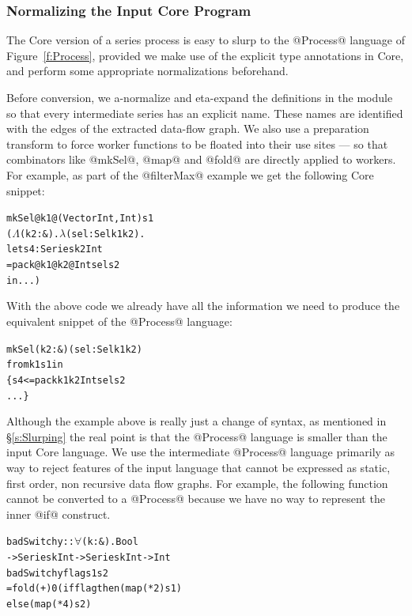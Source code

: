\subsubsection{Normalizing the Input Core Program }
\label{s:Normalizing}
The Core version of a series process is easy to slurp to the @Process@ language of Figure~\ref{f:Process}, provided we make use of the explicit type annotations in Core, and perform some appropriate normalizations beforehand.

Before conversion, we a-normalize and eta-expand the definitions in the module so that every intermediate series has an explicit name. These names are identified with the edges of the extracted data-flow graph. We also use a preparation transform to force worker functions to be floated into their use sites --- so that combinators like @mkSel@, @map@ and @fold@ are directly applied to workers. For example, as part of the @filterMax@ example we get the following Core snippet:
%
\begin{alltt}
  mkSel @k1 @(Vector Int, Int) s1
    (\(\Lambda\)(k2 : &). \(\lambda\)(sel : Sel k1 k2). 
     let s4 : Series k2 Int
            = pack @k1 @k2 @Int sel s2
     in ...)
\end{alltt}

With the above code we already have all the information we need to produce the equivalent snippet of the @Process@ language:
%
\begin{alltt}
  mkSel (k2 : &) (sel : Sel k1 k2) 
       from k1 s1 in 
    \{ s4  <= pack k1 k2 Int sel s2
      ... \}
\end{alltt}

Although the example above is really just a change of syntax, as mentioned in \S\ref{s:Slurping} the real point is that the @Process@ language is smaller than the input Core language. We use the intermediate @Process@ language primarily as way to reject features of the input language that cannot be expressed as static, first order, non recursive data flow graphs. For example, the following function cannot be converted to a @Process@ because we have no way to represent the inner @if@ construct. 

\begin{alltt}
 badSwitchy :: \(\forall\)(k : &). Bool 
            -> Series k Int -> Series k Int -> Int
 badSwitchy flag s1 s2
  = fold (+) 0 (if flag then (map (* 2) s1) 
                        else (map (* 4) s2)
\end{alltt}

